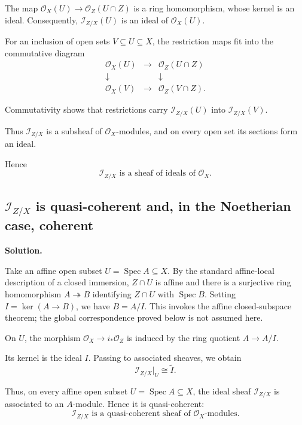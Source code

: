 The map \(\mathcal{O}_X(U)\longrightarrow\mathcal{O}_Z(U\cap Z)\)
is a ring homomorphism, whose kernel is an ideal. Consequently,
\(\mathcal{I}_{Z/X}(U)\) is an ideal of \(\mathcal{O}_X(U)\).

For an inclusion of open sets \(V\subseteq U\subseteq X\),
the restriction maps fit into the commutative diagram
\[
\begin{array}{ccc}
	\mathcal{O}_X(U) & \longrightarrow & \mathcal{O}_Z(U\cap Z) \\[4pt]
	\downarrow & & \downarrow \\[4pt]
	\mathcal{O}_X(V) & \longrightarrow & \mathcal{O}_Z(V\cap Z).
\end{array}
\]

Commutativity shows that restrictions carry
\(\mathcal{I}_{Z/X}(U)\) into \(\mathcal{I}_{Z/X}(V)\).

Thus \(\mathcal{I}_{Z/X}\) is a subsheaf of \(\mathcal{O}_X\)-modules, and on every open set its sections form an ideal.

Hence
\[
\boxed{
	\mathcal{I}_{Z/X}
	\text{ is a sheaf of ideals of }\mathcal{O}_X.
}
\]

\subsection{\texorpdfstring{\(\mathcal{I}_{Z/X}\)}{I Z/X} is quasi-coherent and, in the Noetherian case, coherent}

\textbf{Solution.}

Take an affine open subset \(U=\operatorname{Spec}A\subseteq X\).
By the standard affine-local description of a closed immersion,
\(Z\cap U\) is affine and there is a surjective ring homomorphism
\(A\twoheadrightarrow B\) identifying \(Z\cap U\) with
\(\operatorname{Spec}B\). Setting \(I=\ker(A\to B)\), we have
\(B=A/I\). This invokes the affine closed-subspace theorem; the
global correspondence proved below is not assumed here.

On \(U\), the morphism
\(\mathcal{O}_X\longrightarrow i_*\mathcal{O}_Z\)
is induced by the ring quotient \(A\longrightarrow A/I\).

Its kernel is the ideal \(I\). Passing to associated sheaves, we obtain
\[
\mathcal{I}_{Z/X}|_U
\cong
\widetilde{I}.
\]

Thus, on every affine open subset \(U=\operatorname{Spec} A\subseteq X\), the ideal sheaf \(\mathcal{I}_{Z/X}\) is associated to an \(A\)-module. Hence it is quasi-coherent:
\[
\boxed{
	\mathcal{I}_{Z/X}
	\text{ is a quasi-coherent sheaf of }\mathcal{O}_X\text{-modules.}
}
\]

